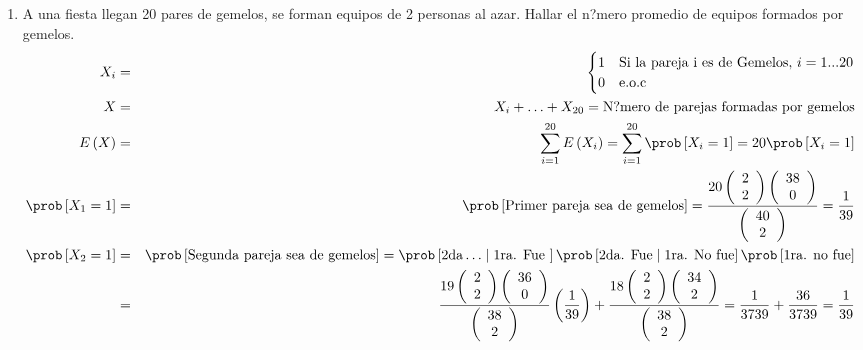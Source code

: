 \begin{enumerate}
\item A una fiesta llegan 20 pares de gemelos, se forman equipos de 2 personas al azar. Hallar el n?mero promedio de equipos formados por gemelos.     
\begin{eqnarray*}  
X_{i}&=&  \begin{cases}
1 & \textrm{Si la pareja i es de Gemelos}, \, i= 1... 20 \\
0 & \textrm{e.o.c}
\end{cases}\\   
X &=& X_{i}+ \ldots + X_{20}= \textrm{N?mero de parejas formadas por gemelos} \\
E \left(X \right) &=& \sum_{i=1}^{20} E \left(X_{i} \right) = \sum_{i=1}^{20} \prob \left[ X_{i}= 1 \right]= 20 \prob \left[X_{i}=1 \right]\\
\prob \left[ X_{1} = 1 \right] &=& \prob \left[ \textrm{Primer pareja sea de gemelos} \right] = \dfrac{20 \left(\begin{array}{c} 2 \\2\end{array} \right)\left(\begin{array}{c} 38 \\0\end{array}  \right)}{\left(\begin{array}{c} 40 \\2\end{array} \right)} = \frac{1}{39} \\
\prob \left[ X_{2}=1 \right]&=& \prob \left[ \textrm{Segunda pareja sea de gemelos} \right]= \prob \left[\textrm{2da}\ldots \mid \textrm{1ra. Fue }\right] \prob \left[\textrm{2da. Fue}\mid \textrm{1ra. No fue} \right]\prob \left[ \textrm{1ra. no fue} \right]\\
&=& \dfrac{19 \left( \begin{array}{c} 2 \\2\end{array} \right) \left(\begin{array}{c} 36 \\0 \end{array} \right)}{\left( \begin{array}{c} 38 \\2\end{array} \right)} \left( \frac{1}{39} \right)+ \dfrac{18 \left(\begin{array}{c} 2 \\2\end{array} \right) \left( \begin{array}{c} 34 \\2\end{array} \right)}{\left(\begin{array}{c} 38 \\2\end{array} \right) }= \frac{1}{3739}+ \frac{36}{3739} = \frac{1}{39}
\end{eqnarray*}


\end{enumerate}
